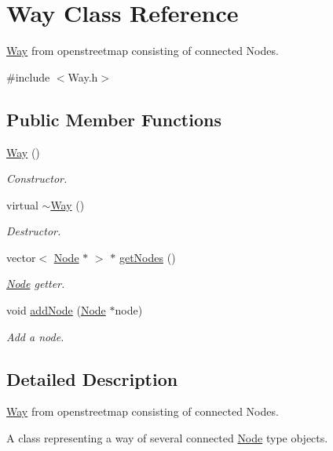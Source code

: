 \hypertarget{classWay}{\section{Way Class Reference}
\label{classWay}
}


\hyperlink{classWay}{Way} from openstreetmap consisting of connected Nodes.  




{\ttfamily \#include $<$Way.\+h$>$}

\subsection*{Public Member Functions}
\begin{DoxyCompactItemize}
\item 
\hyperlink{classWay_a420b7bfe31b1c68e90c3ca1c60edee06}{Way} ()
\begin{DoxyCompactList}\small\item\em Constructor. \end{DoxyCompactList}\item 
virtual \hyperlink{classWay_aa118212423fa0f1b5c33663e1e0d0b74}{$\sim$\+Way} ()
\begin{DoxyCompactList}\small\item\em Destructor. \end{DoxyCompactList}\item 
vector$<$ \hyperlink{classNode}{Node} $\ast$ $>$ $\ast$ \hyperlink{classWay_a690c2eeae8128b5f8d201bba41570d71}{get\+Nodes} ()
\begin{DoxyCompactList}\small\item\em \hyperlink{classNode}{Node} getter. \end{DoxyCompactList}\item 
void \hyperlink{classWay_ada3668577e62311e7c56d2575e5edd00}{add\+Node} (\hyperlink{classNode}{Node} $\ast$node)
\begin{DoxyCompactList}\small\item\em Add a node. \end{DoxyCompactList}\end{DoxyCompactItemize}


\subsection{Detailed Description}
\hyperlink{classWay}{Way} from openstreetmap consisting of connected Nodes. 

A class representing a way of several connected \hyperlink{classNode}{Node} type objects.

